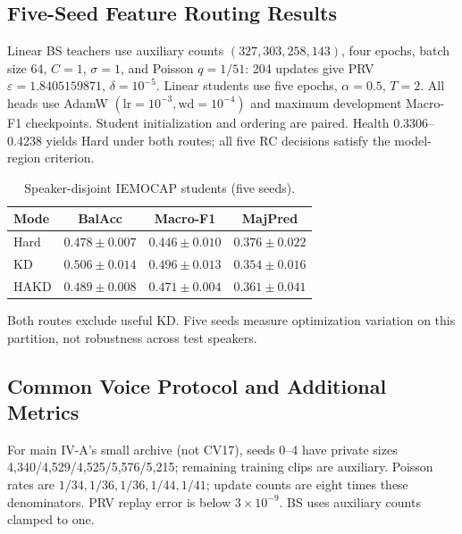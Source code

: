 \documentclass[journal]{IEEEtran}
\begin{document}
\subsection{Five-Seed Feature Routing Results}
Linear BS teachers use auxiliary counts $(327,303,258,143)$, four epochs, batch size 64, $C=1$, $\sigma=1$, and Poisson $q=1/51$: 204 updates give PRV $\varepsilon=1.8405159871$, $\delta=10^{-5}$. Linear students use five epochs, $\alpha=0.5$, $T=2$. All heads use AdamW $(\mathrm{lr}=10^{-3},\mathrm{wd}=10^{-4})$ and maximum development Macro-F1 checkpoints. Student initialization and ordering are paired. Health 0.3306--0.4238 yields Hard under both routes; all five RC decisions satisfy the model-region criterion.
\begin{table}[t]
\centering\footnotesize\setlength{\tabcolsep}{5pt}
\caption{Speaker-disjoint IEMOCAP students (five seeds).}
\label{tab:iemocap_original}
\begin{tabular}{lccc}\toprule
Mode & BalAcc & Macro-F1 & MajPred\\\midrule
Hard & $0.478\pm0.007$ & $0.446\pm0.010$ & $0.376\pm0.022$\\
KD & $0.506\pm0.014$ & $0.496\pm0.013$ & $0.354\pm0.016$\\
HAKD & $0.489\pm0.008$ & $0.471\pm0.004$ & $0.361\pm0.041$\\\bottomrule
\end{tabular}
\end{table}
Both routes exclude useful KD. Five seeds measure optimization variation on this partition, not robustness across test speakers.

\subsection{Common Voice Protocol and Additional Metrics}
For main IV-A's small archive (not CV17), seeds 0--4 have private sizes 4,340/4,529/4,525/5,576/5,215; remaining training clips are auxiliary. Poisson rates are $1/34,1/36,1/36,1/44,1/41$; update counts are eight times these denominators. PRV replay error is below $3\times10^{-9}$. BS uses auxiliary counts clamped to one.
\end{document}
